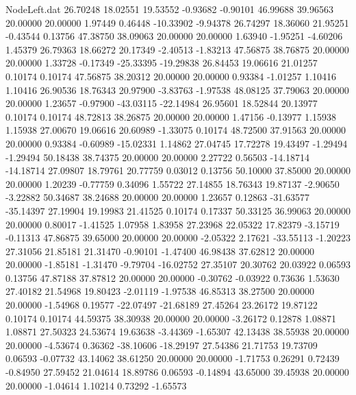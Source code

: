 \begin{filecontents}{NodeLeft.dat}
  26.70248   18.02551   19.53552    -0.93682   -0.90101   46.99688   39.96563   20.00000   20.00000    1.97449    0.46448  -10.33902   -9.94378
  26.74297   18.36060   21.95251    -0.43544    0.13756   47.38750   38.09063   20.00000   20.00000    1.63940   -1.95251   -4.60206    1.45379
  26.79363   18.66272   20.17349    -2.40513   -1.83213   47.56875   38.76875   20.00000   20.00000    1.33728   -0.17349  -25.33395  -19.29838
  26.84453   19.06616   21.01257     0.10174    0.10174   47.56875   38.20312   20.00000   20.00000    0.93384   -1.01257    1.10416    1.10416
  26.90536   18.76343   20.97900    -3.83763   -1.97538   48.08125   37.79063   20.00000   20.00000    1.23657   -0.97900  -43.03115  -22.14984
  26.95601   18.52844   20.13977     0.10174    0.10174   48.72813   38.26875   20.00000   20.00000    1.47156   -0.13977    1.15938    1.15938
  27.00670   19.06616   20.60989    -1.33075    0.10174   48.72500   37.91563   20.00000   20.00000    0.93384   -0.60989  -15.02331    1.14862
  27.04745   17.72278   19.43497    -1.29494   -1.29494   50.18438   38.74375   20.00000   20.00000    2.27722    0.56503  -14.18714  -14.18714
  27.09807   18.79761   20.77759     0.03012    0.13756   50.10000   37.85000   20.00000   20.00000    1.20239   -0.77759    0.34096    1.55722
  27.14855   18.76343   19.87137    -2.90650   -3.22882   50.34687   38.24688   20.00000   20.00000    1.23657    0.12863  -31.63577  -35.14397
  27.19904   19.19983   21.41525     0.10174    0.17337   50.33125   36.99063   20.00000   20.00000    0.80017   -1.41525    1.07958    1.83958
  27.23968   22.05322   17.82379    -3.15719   -0.11313   47.86875   39.65000   20.00000   20.00000   -2.05322    2.17621  -33.55113   -1.20223
  27.31056   21.85181   21.31470    -0.90101   -1.47400   46.98438   37.62812   20.00000   20.00000   -1.85181   -1.31470   -9.79704  -16.02752
  27.35107   20.30762   20.03922     0.06593    0.13756   47.87188   37.87812   20.00000   20.00000   -0.30762   -0.03922    0.73636    1.53630
  27.40182   21.54968   19.80423    -2.01119   -1.97538   46.85313   38.27500   20.00000   20.00000   -1.54968    0.19577  -22.07497  -21.68189
  27.45264   23.26172   19.87122     0.10174    0.10174   44.59375   38.30938   20.00000   20.00000   -3.26172    0.12878    1.08871    1.08871
  27.50323   24.53674   19.63638    -3.44369   -1.65307   42.13438   38.55938   20.00000   20.00000   -4.53674    0.36362  -38.10606  -18.29197
  27.54386   21.71753   19.73709     0.06593   -0.07732   43.14062   38.61250   20.00000   20.00000   -1.71753    0.26291    0.72439   -0.84950
  27.59452   21.04614   18.89786     0.06593   -0.14894   43.65000   39.45938   20.00000   20.00000   -1.04614    1.10214    0.73292   -1.65573

\end{filecontents}
